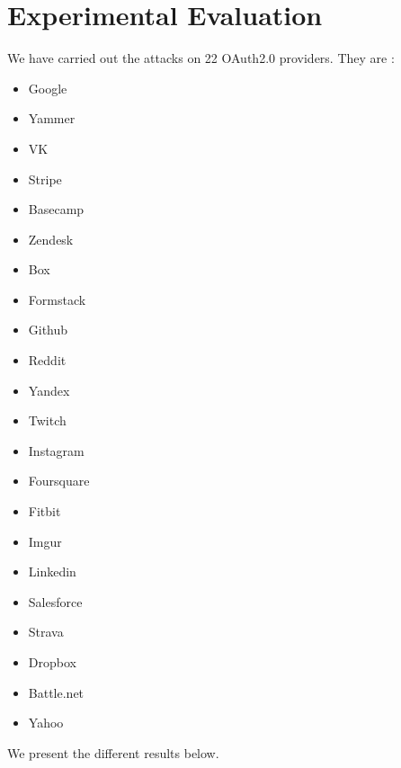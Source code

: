 \section{Experimental Evaluation}
\label{sec:evaluation}
We have carried out the attacks on 22 OAuth2.0 providers. They are : 
\begin{itemize}
\item Google
\item Yammer
\item VK
\item Stripe
\item Basecamp
\item Zendesk
\item Box
\item Formstack
\item Github
\item Reddit
\item Yandex
\item Twitch
\item Instagram
\item Foursquare
\item Fitbit
\item Imgur
\item Linkedin
\item Salesforce
\item Strava
\item Dropbox
\item Battle.net
\item Yahoo
\end{itemize}
We present the different results below. 
